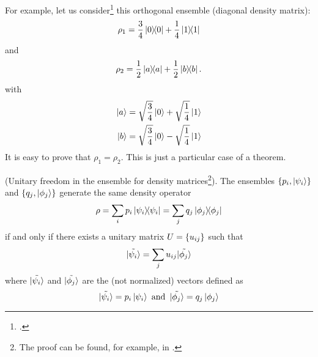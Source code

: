 For example, let us consider\footcite[\emph{Exercise 2.71: (Criterion to decide if a state is mixed or pure)}]{NielsenChuang}
this orthogonal ensemble (diagonal density matrix):
\[
  \rho_1 = \frac{3}{4}\ketbra{0}{0} + \frac{1}{4}\ketbra{1}{1}
\]
and
\[
  \rho_2 = \frac{1}{2}\ketbra{a}{a} + \frac{1}{2}\ketbra{b}{b}\text{.}
\]
with
\begin{align*}
  \ket{a} &= \sqrt{\frac{3}{4}}\ket{0} + \sqrt{\frac{1}{4}}\ket{1} \\
  \ket{b} &= \sqrt{\frac{3}{4}}\ket{0} - \sqrt{\frac{1}{4}}\ket{1}
\end{align*}
It is easy to prove that $\rho_1 = \rho_2$. This is just a particular
case of a theorem.
\begin{theorem}{(Unitary freedom in the ensemble for density matrices\footnote{
  \citereset The proof can be found, for example, in \cite[\emph{Theorem 2.6}]{NielsenChuang}.
}).}\label{th:density_u_free}
  The ensembles
  $\left\{p_i, \ket{\psi_i}\right\}$ and $\left\{q_{j}, \ket{\phi_j}\right\}$
  generate the same density operator
  $$\rho = \sum_i p_i \ketbra{\psi_i} = \sum_j q_j \ketbra{\phi_j}$$
  if and only if there exists
  a unitary matrix %
  $U = \left\{u_{ij}\right\}$ such that
  \[
    \tilde{\ket{\psi_i}} = \sum_j u_{ij}\tilde{\ket{\phi_j}}
  \]
  where $\tilde{\ket{\psi_i}}$ and $\tilde{\ket{\phi_j}}$
  are the (not normalized) vectors defined as
  \[
    \tilde{\ket{\psi_i}} = p_{i}\ket{\psi_i}
    \text{ and }\,
    \tilde{\ket{\phi_j}} = q_{j}\ket{\phi_j}
  \]
\end{theorem}
